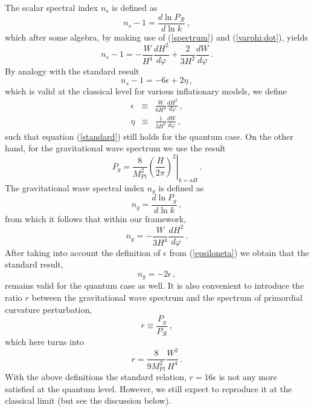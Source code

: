 The scalar spectral index $n_{s}$ is defined as
\begin{equation}
n_{s}-1 = \frac{d\ln P_{\mathcal{R}}}{d\ln k}\,, \label{spectral
index}
\end{equation}
which after some algebra, by making use of (\ref{spectrum}) and
(\ref{varphi:dot}), yields
\begin{equation}
n_s-1 =  -\frac{W}{H^4}\frac{dH^2}{d\varphi} +
\frac{2}{3H^2}\frac{dW}{d\varphi}
\,.
\label{spectral index final}
\end{equation}
By analogy with the standard result
\begin{equation}
n_s-1=-6\epsilon+2\eta\,,
\label{standard}
\end{equation}
which is valid at the classical level for various inflationary models,
we define
\begin{eqnarray}
\epsilon &\equiv & \frac{W}{6H^4}\frac{dH^2}{d\varphi}\,,\nonumber\\
\eta &\equiv & \frac{1}{3H^2}\frac{dW}{d\varphi}\,,
\label{epsiloneta}
\end{eqnarray}
such that equation (\ref{standard}) still holds for the quantum
case. On the other hand, for the gravitational wave spectrum we
use the result
\begin{equation}
P_g =
\frac{8}{M^2_{\mathrm{Pl}}}\left.\left(\frac{H}{2\pi}\right)^2\right|_{k=aH}\,.
\end{equation}
The gravitational wave spectral index $n_g$ is defined as
\begin{equation}
n_g = \frac{d\ln P_g}{d\ln k}\,, \label{gw spectral index}
\end{equation}
from which it follows that within our framework,
\begin{equation}
n_g = -\frac{W}{3H^4}\frac{dH^2}{d\varphi}\,.
\end{equation}
After taking into account the definition of $\epsilon$ from
(\ref{epsiloneta}) we obtain that the standard result,
\begin{equation}
n_g = -2\epsilon\,,
\label{ng:Q}
\end{equation}
remains valid for the quantum case as well. It is also convenient
to introduce the ratio $r$ between the gravitational wave spectrum
and the spectrum of primordial curvature perturbation,
\begin{equation}
r \equiv \frac{P_g}{P_{\mathcal{R}}}\,,
\end{equation}
which here turns into
\begin{equation}
r = \frac{8}{9M^2_{\mathrm{Pl}}}\frac{W^2}{H^4}\,.\label{ratio}
\end{equation}
With the above definitions the standard relation, $r=16\epsilon$
is not any more satisfied at the quantum
level. However, we still expect to reproduce it at the
classical limit (but see the discussion below).

